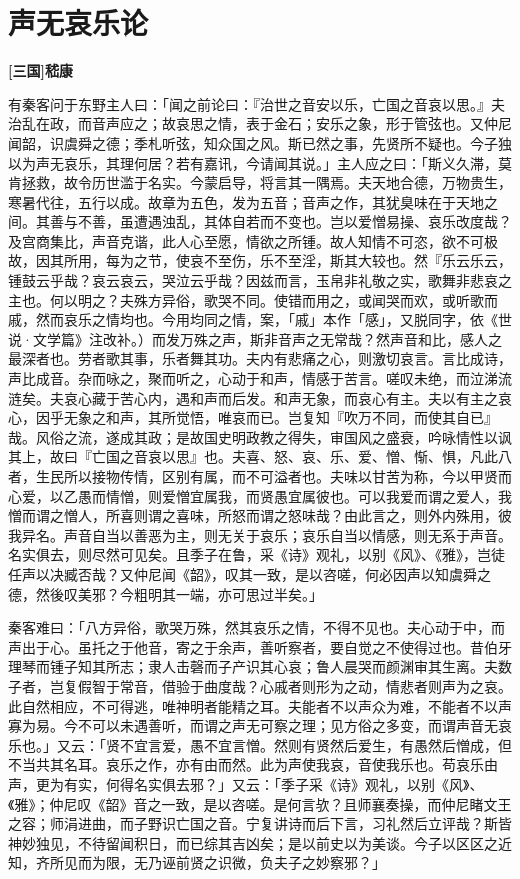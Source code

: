 \documentclass[UTF8,titlepage,oneside]{ctexbook}
\begin{document}
\chapter*{声无哀乐论}
\begin{center}
	\textbf{[三国]嵇康}
\end{center}


有秦客问于东野主人曰：「闻之前论曰：『治世之音安以乐，亡国之音哀以思。』夫治乱在政，而音声应之；故哀思之情，表于金石；安乐之象，形于管弦也。又仲尼闻韶，识虞舜之德；季札听弦，知众国之风。斯已然之事，先贤所不疑也。今子独以为声无哀乐，其理何居？若有嘉讯，今请闻其说。」主人应之曰：「斯义久滞，莫肯拯救，故令历世滥于名实。今蒙启导，将言其一隅焉。夫天地合德，万物贵生，寒暑代往，五行以成。故章为五色，发为五音；音声之作，其犹臭味在于天地之间。其善与不善，虽遭遇浊乱，其体自若而不变也。岂以爱憎易操、哀乐改度哉？及宫商集比，声音克谐，此人心至愿，情欲之所锺。故人知情不可恣，欲不可极故，因其所用，每为之节，使哀不至伤，乐不至淫，斯其大较也。然『乐云乐云，锺鼓云乎哉？哀云哀云，哭泣云乎哉？因兹而言，玉帛非礼敬之实，歌舞非悲哀之主也。何以明之？夫殊方异俗，歌哭不同。使错而用之，或闻哭而欢，或听歌而戚，然而哀乐之情均也。今用均同之情，案，「戚」本作「感」，又脱同字，依《世说·文学篇》注改补。）而发万殊之声，斯非音声之无常哉？然声音和比，感人之最深者也。劳者歌其事，乐者舞其功。夫内有悲痛之心，则激切哀言。言比成诗，声比成音。杂而咏之，聚而听之，心动于和声，情感于苦言。嗟叹未绝，而泣涕流涟矣。夫哀心藏于苦心内，遇和声而后发。和声无象，而哀心有主。夫以有主之哀心，因乎无象之和声，其所觉悟，唯哀而已。岂复知『吹万不同，而使其自已』哉。风俗之流，遂成其政；是故国史明政教之得失，审国风之盛衰，吟咏情性以讽其上，故曰『亡国之音哀以思』也。夫喜、怒、哀、乐、爱、憎、惭、惧，凡此八者，生民所以接物传情，区别有属，而不可溢者也。夫味以甘苦为称，今以甲贤而心爱，以乙愚而情憎，则爱憎宜属我，而贤愚宜属彼也。可以我爱而谓之爱人，我憎而谓之憎人，所喜则谓之喜味，所怒而谓之怒味哉？由此言之，则外内殊用，彼我异名。声音自当以善恶为主，则无关于哀乐；哀乐自当以情感，则无系于声音。名实俱去，则尽然可见矣。且季子在鲁，采《诗》观礼，以别《风》、《雅》，岂徒任声以决臧否哉？又仲尼闻《韶》，叹其一致，是以咨嗟，何必因声以知虞舜之德，然後叹美邪？今粗明其一端，亦可思过半矣。」


秦客难曰：「八方异俗，歌哭万殊，然其哀乐之情，不得不见也。夫心动于中，而声出于心。虽托之于他音，寄之于余声，善听察者，要自觉之不使得过也。昔伯牙理琴而锺子知其所志；隶人击磬而子产识其心哀；鲁人晨哭而颜渊审其生离。夫数子者，岂复假智于常音，借验于曲度哉？心戚者则形为之动，情悲者则声为之哀。此自然相应，不可得逃，唯神明者能精之耳。夫能者不以声众为难，不能者不以声寡为易。今不可以未遇善听，而谓之声无可察之理；见方俗之多变，而谓声音无哀乐也。」又云：「贤不宜言爱，愚不宜言憎。然则有贤然后爱生，有愚然后憎成，但不当共其名耳。哀乐之作，亦有由而然。此为声使我哀，音使我乐也。苟哀乐由声，更为有实，何得名实俱去邪？」又云：「季子采《诗》观礼，以别《风》、《雅》；仲尼叹《韶》音之一致，是以咨嗟。是何言欤？且师襄奏操，而仲尼睹文王之容；师涓进曲，而子野识亡国之音。宁复讲诗而后下言，习礼然后立评哉？斯皆神妙独见，不待留闻积日，而已综其吉凶矣；是以前史以为美谈。今子以区区之近知，齐所见而为限，无乃诬前贤之识微，负夫子之妙察邪？」
\end{document}

